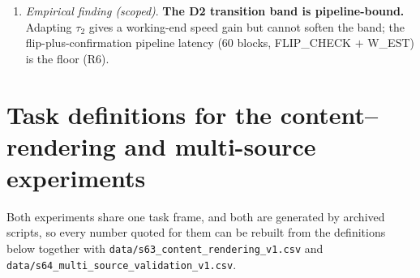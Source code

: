 \documentclass[preprint,12pt]{elsarticle}
\begin{document}
\begin{enumerate}[label=\arabic*.]
negligibly on the deployed coupled one ($+1.4\pm1.8$\,pp, $5/10$ seeds; the
paired $t=2.45$ does exceed the critical value $2.262$, so the claim is
withheld on effect size rather than on significance). One
family pair was tested and no non-transferring control arm was run, so no
general structure-matching rule is claimed; the frozen hypothesis's own
accuracy on the ring segment is $0.576$ and the selection share of the segment
varies from $9$\% to $92$\% across seeds, so the gain is neither large nor
uniformly engaged (R5).
\item \emph{Empirical finding (scoped)}. \textbf{The D2 transition band is pipeline-bound.} Adapting $\tau_2$
gives a working-end speed gain but cannot soften the band; the
flip-plus-confirmation pipeline
latency ($60$ blocks, FLIP\_CHECK $+$ W\_EST) is the floor (R6).
\end{enumerate}

\section{Task definitions for the content--rendering and multi-source
experiments}
\label{app:s63s64}

Both experiments share one task frame, and both are generated by archived
scripts, so every number quoted for them can be rebuilt from the definitions
below together with \texttt{data/s63\_content\_rendering\_v1.csv} and
\texttt{data/s64\_multi\_source\_validation\_v1.csv}.
\end{document}
